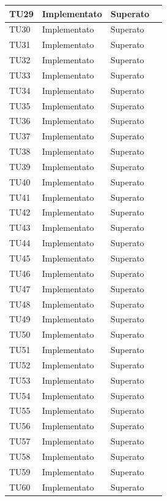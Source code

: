 \begin{longtable}{|>{\centering\arraybackslash}m{1.6cm}|>{\centering\arraybackslash}m{6.41cm}|>{\centering\arraybackslash}m{3.1cm}| c |}
	TU29 & Implementato & Superato  \\ \hline
	TU30 & Implementato & Superato  \\ \hline
	TU31 & Implementato & Superato  \\ \hline
	TU32 & Implementato & Superato  \\ \hline
	TU33 & Implementato & Superato  \\ \hline
	TU34 & Implementato & Superato  \\ \hline
	TU35 & Implementato & Superato \\ \hline
	TU36 & Implementato & Superato \\ \hline
	TU37 & Implementato & Superato  \\ \hline
	TU38 & Implementato & Superato  \\ \hline
	TU39 & Implementato & Superato  \\ \hline
	TU40 & Implementato & Superato  \\ \hline
	TU41 & Implementato & Superato  \\ \hline
	TU42 & Implementato & Superato  \\ \hline
	TU43 & Implementato & Superato  \\ \hline
	TU44 & Implementato & Superato  \\ \hline
	TU45 & Implementato & Superato  \\ \hline
	TU46 & Implementato & Superato  \\ \hline
	TU47 & Implementato & Superato  \\ \hline
	TU48 & Implementato & Superato  \\ \hline
	TU49 & Implementato & Superato  \\ \hline
	TU50 & Implementato & Superato  \\ \hline
	TU51 & Implementato & Superato  \\ \hline
	TU52 & Implementato & Superato  \\ \hline
	TU53 & Implementato & Superato  \\ \hline
	TU54 & Implementato & Superato  \\ \hline
	TU55 & Implementato & Superato  \\ \hline
	TU56 & Implementato & Superato  \\ \hline
	TU57 & Implementato & Superato  \\ \hline
	TU58 & Implementato & Superato  \\ \hline
	TU59 & Implementato & Superato  \\ \hline
	TU60 & Implementato & Superato  \\ \hline

\end{longtable}
